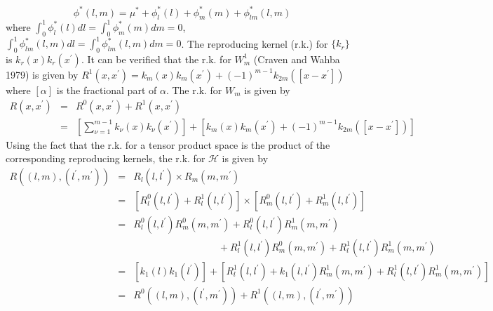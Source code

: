 \begin{equation}
\phi^*\left(l,m\right) = \mu^* + \phi_l^*\left(l\right) + \phi_m^*\left(m\right) + \phi_{lm}^*\left(l,m\right)  \label{eq:ANOVAdecomp}
\end{equation} 
\noindent
where $\int_{0}^1 \phi^*_{l}\left(l\right)dl = \int_{0}^1 \phi^*_{m}\left(m\right)dm = 0$, $\int_{0}^1 \phi^*_{lm}\left(l,m\right)dl = \int_{0}^1 \phi^*_{lm}\left(l,m\right)dm = 0$. The reproducing kernel (r.k.) for $\lbrace k_r \rbrace$ is $k_r\left(x \right)k_r\left(x^\prime \right)$. It can be verified that the r.k. for $W_m^1$ (Craven and Wahba 1979) is given by $R^1\left(x,x^\prime\right) = k_m\left(x \right)k_m\left(x^\prime \right) + \left( -1 \right)^{m-1}k_{2m}\left(\left[ x-x^\prime \right] \right)$
where $\left[ \alpha \right]$ is the fractional part of $\alpha$. The r.k. for $W_m$ is given by 
\begin{eqnarray*}
R\left(x,x^\prime\right) &=& R^0\left(x,x^\prime\right) + R^1\left(x,x^\prime\right) \\
&=&\left[ \sum_{\nu=1}^{m-1} k_\nu\left(x \right)k_\nu\left(x^\prime \right) \right]+ \left[ k_m\left(x \right)k_m\left(x^\prime \right) + \left( -1 \right)^{m-1}k_{2m}\left(\left[ x-x^\prime \right] \right)\right] \label{eq:RKforH1}
\end{eqnarray*}
\noindent
Using the fact that the r.k. for a tensor product space is the product of the corresponding reproducing kernels, the r.k. for $\mathcal{H}$ is given by 
\begin{eqnarray}
R\left( \left(l,m\right),\left(l^\prime,m^\prime\right)\right) &=&  R_l\left(l,l^\prime\right) \times R_m\left(m,m^\prime\right) \nonumber \\
 &=& \left[  R_l^0\left(l,l^\prime\right) + R_l^1\left(l,l^\prime\right) \right] \times \left[  R_m^0\left(l,l^\prime\right) + R_m^1\left(l,l^\prime\right) \right] \nonumber \\
 &=& R_l^0\left(l,l^\prime\right)R_m^0\left(m,m^\prime\right) + R_l^0\left(l,l^\prime\right) R_m^1\left(m,m^\prime\right) \nonumber \\
&\mbox{ }&\;\;\;\;\;\;\;\;\;\;\;\;\;\;\;\;\;\;\;\;\;\;\;\;\;\;\;\;\;\;\; +  R_l^1\left(l,l^\prime\right) R_m^0\left(m,m^\prime\right)  + R_l^1\left(l,l^\prime\right) R_m^1\left(m,m^\prime\right) \nonumber \\
&=& \left[ k_1\left(l \right)k_1\left(l^\prime \right)\right] + \left[ R_l^1\left(l,l^\prime\right)  + k_1\left(l,l^\prime\right) R_m^1\left(m,m^\prime\right) + R_l^1\left(l,l^\prime\right) R_m^1\left(m,m^\prime\right)\right] \nonumber \\
&=& R^0\left( \left(l,m\right) , \left(l^\prime,m^\prime \right) \right) + R^1\left( \left(l,m\right) , \left(l^\prime,m^\prime \right) \right)
\end{eqnarray}


